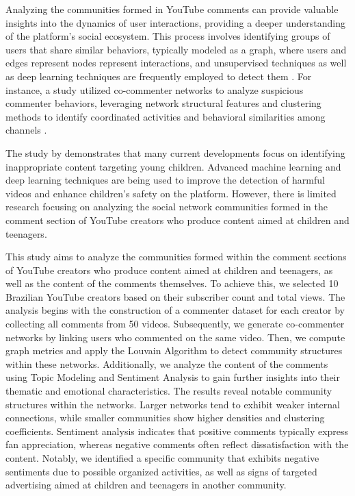 \documentclass[sigconf]{acmart}
\begin{document}
Analyzing the communities formed in YouTube comments can provide valuable 
insights into the dynamics of user interactions, providing a deeper understanding of 
the platform's social ecosystem. This process involves identifying groups of users that share similar
behaviors, typically modeled as a graph, where users and edges represent nodes represent 
interactions, and unsupervised techniques as well as deep learning techniques are frequently employed 
to detect them \cite{nooribakhsh2024community}. For instance, a study utilized co-commenter networks 
to analyze suspicious commenter behaviors, leveraging network structural features and clustering 
methods to identify coordinated activities and behavioral similarities among channels \cite{shajari2023}.

The study by \cite{app13064044} demonstrates that many current developments focus on identifying
inappropriate content targeting young children. Advanced machine learning and deep learning 
techniques are being used to improve the detection of harmful videos and enhance 
children's safety on the platform. However, there is limited research focusing on analyzing 
the social network communities formed in the comment section of YouTube creators who 
produce content aimed at children and teenagers.

This study aims to analyze the communities formed within the comment sections of YouTube creators who 
produce content aimed at children and teenagers, as well as the content of the comments themselves. 
To achieve this, we selected 10 Brazilian YouTube creators based on their 
subscriber count and total views. The analysis begins with the construction of a commenter dataset for 
each creator by collecting all comments from 50 videos. Subsequently, we generate co-commenter networks 
by linking users who commented on the same video. Then, we compute graph metrics and apply the 
Louvain Algorithm to detect community structures within these networks. Additionally, we analyze the 
content of the comments using Topic Modeling and Sentiment Analysis to gain further 
insights into their thematic and emotional characteristics. 
The results reveal notable community structures within the networks. Larger networks tend to exhibit 
weaker internal connections, while smaller communities show higher densities and clustering coefficients. 
Sentiment analysis indicates that positive comments typically express fan appreciation, whereas negative 
comments often reflect dissatisfaction with the content. 
Notably, we identified a specific community that exhibits negative sentiments due 
to possible organized activities, as well as signs of targeted advertising aimed at children and teenagers 
in another community. 
\end{document}
